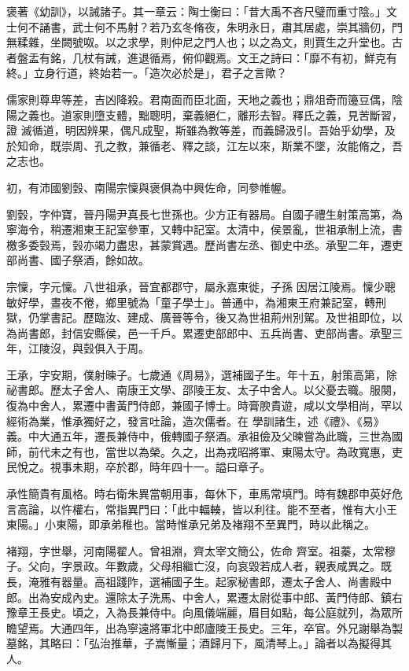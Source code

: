 \begin{pinyinscope}
 褒著《幼訓》，以誡諸子。其一章云：陶士衡曰：「昔大禹不吝尺璧而重寸陰。」文士何不誦書，武士何不馬射？若乃玄冬脩夜，朱明永日，肅其居處，崇其牆仞，門無糅雜，坐闕號呶。以之求學，則仲尼之門人也；以之為文，則賈生之升堂也。古者盤盂有銘，几杖有誡，進退循焉，俯仰觀焉。文王之詩曰：「靡不有初，鮮克有終。」立身行道，終始若一。「造次必於是」，君子之言歟？



 儒家則尊卑等差，吉凶降殺。君南面而臣北面，天地之義也；鼎俎奇而籩豆偶，陰陽之義也。道家則墮支體，黜聰明，棄義絕仁，離形去智。釋氏之義，見苦斷習，證
 滅循道，明因辨果，偶凡成聖，斯雖為教等差，而義歸汲引。吾始乎幼學，及於知命，既崇周、孔之教，兼循老、釋之談，江左以來，斯業不墜，汝能脩之，吾之志也。



 初，有沛國劉瑴、南陽宗懍與褒俱為中興佐命，同參帷幄。



 劉瑴，字仲寶，晉丹陽尹真長七世孫也。少方正有器局。自國子禮生射策高第，為寧海令，稍遷湘東王記室參軍，又轉中記室。太清中，侯景亂，世祖承制上流，書檄多委瑴焉，瑴亦竭力盡忠，甚蒙賞遇。歷尚書左丞、御史中丞。承聖二年，遷吏部尚書、國子祭酒，餘如故。



 宗懍，字元懍。八世祖承，晉宜都郡守，屬永嘉東徙，子孫
 因居江陵焉。懍少聰敏好學，晝夜不倦，鄉里號為「童子學士」。普通中，為湘東王府兼記室，轉刑獄，仍掌書記。歷臨汝、建成、廣晉等令，後又為世祖荊州別駕。及世祖即位，以為尚書郎，封信安縣侯，邑一千戶。累遷吏部郎中、五兵尚書、吏部尚書。承聖三年，江陵沒，與瑴俱入于周。



 王承，字安期，僕射暕子。七歲通《周易》，選補國子生。年十五，射策高第，除祕書郎。歷太子舍人、南康王文學、邵陵王友、太子中舍人。以父憂去職。服闋，復為中舍人，累遷中書黃門侍郎，兼國子博士。時膏腴貴遊，咸以文學相尚，罕以經術為業，惟承獨好之，發言吐論，造次儒者。在
 學訓諸生，述《禮》、《易》義。中大通五年，遷長兼侍中，俄轉國子祭酒。承祖儉及父暕嘗為此職，三世為國師，前代未之有也，當世以為榮。久之，出為戎昭將軍、東陽太守。為政寬惠，吏民悅之。視事未期，卒於郡，時年四十一。謚曰章子。



 承性簡貴有風格。時右衛朱異當朝用事，每休下，車馬常填門。時有魏郡申英好危言高論，以忤權右，常指異門曰：「此中輻輳，皆以利往。能不至者，惟有大小王東陽。」小東陽，即承弟稚也。當時惟承兄弟及褚翔不至異門，時以此稱之。



 褚翔，字世舉，河南陽翟人。曾祖淵，齊太宰文簡公，佐命
 齊室。祖蓁，太常穆子。父向，字景政。年數歲，父母相繼亡沒，向哀毀若成人者，親表咸異之。既長，淹雅有器量。高祖踐阼，選補國子生。起家秘書郎，遷太子舍人、尚書殿中郎。出為安成內史。還除太子洗馬、中舍人，累遷太尉從事中郎、黃門侍郎、鎮右豫章王長史。頃之，入為長兼侍中。向風儀端麗，眉目如點，每公庭就列，為眾所瞻望焉。大通四年，出為寧遠將軍北中郎廬陵王長史。三年，卒官。外兄謝舉為製墓銘，其略曰：「弘治推華，子嵩慚量；酒歸月下，風清琴上。」論者以為擬得其人。




\end{pinyinscope}
